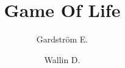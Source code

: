 \documentclass[]{scrreprt}
\title{Game Of Life}
\author{Gardström E. \and Wallin D.}
\begin{document}
\maketitle

\begin{abstract}
\end{abstract}
\end{document}
